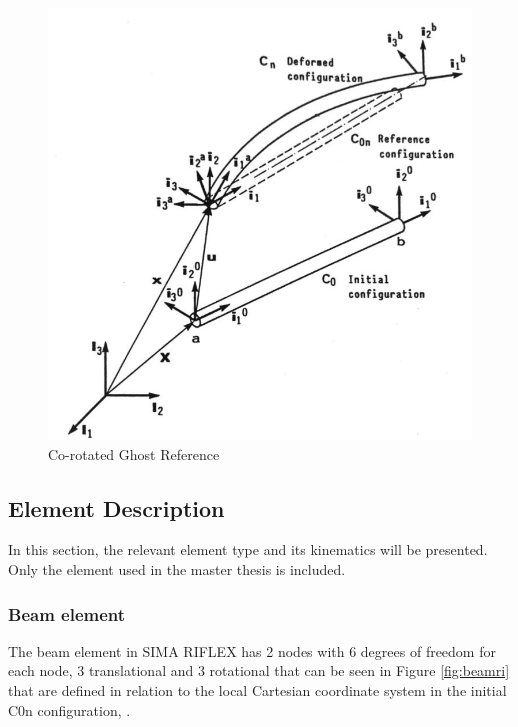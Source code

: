 \begin{figure}[H]
\centering
\includegraphics[scale=0.5]{figures/coro}
\caption[$\; \:$Co-rotated Ghost Reference]{Co-rotated Ghost Reference \cite{Mathisen1990} }
 \label{fig:coro}
\end{figure}

\subsection{Element Description}
In this section, the relevant element type and its kinematics will be presented. Only  the element used in the master thesis is included. 
\subsubsection{Beam element}
\noindent The beam element in SIMA RIFLEX has 2 nodes with 6 degrees of freedom for each node, 3 translational and 3 rotational that can be seen in Figure \ref{fig:beamri} that are defined in relation to the local Cartesian coordinate system in the initial C0n configuration,
\cite{sintef2017}.

